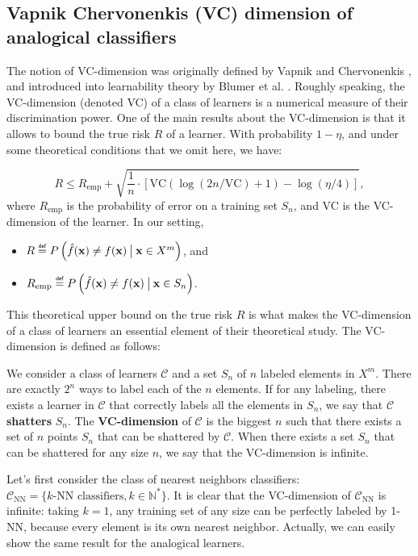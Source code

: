 \subsection{Vapnik Chervonenkis (VC) dimension of analogical classifiers}
\label{SEC:VCdim}
The notion of VC-dimension was originally defined by Vapnik and Chervonenkis
\cite{Vap98}, and introduced into learnability theory by Blumer et al.
\cite{BluEhrHauWarACM89}. Roughly speaking, the VC-dimension (denoted VC) of a class of
learners is a numerical measure of their discrimination power. One of the main
results about the VC-dimension is that it allows to bound the true risk $R$ of
a learner. With probability $1 - \eta$, and under some theoretical conditions
that we omit here, we have:

$$R \leq R_{\text{emp}} + \sqrt{\frac{1}{n} \cdot \left[\text{VC}(\log(2n /
\text{VC}) + 1) - \log(\eta/4)\right]},$$
where $R_\text{emp}$ is the probability of error on a training set $S_n$, and
VC is the VC-dimension of the learner. In our setting,
\begin{itemize}
  \item $R \eqdef P\left(\hat{f}(\mathbf{x}) \neq f(\mathbf{x}) \given[\big]
    \mathbf{x} \in X^m\right)$, and
  \item $R_\text{emp} \eqdef P\left(\hat{f}(\mathbf{x}) \neq f(\mathbf{x})
    \given[\big] \mathbf{x} \in S_n\right)$.
\end{itemize}

This theoretical upper bound on the true risk $R$ is what makes the
VC-dimension of a class of learners an essential element of their theoretical
study. The VC-dimension is defined as follows:

\begin{definition}[VC-dimension]
  \label{DEF:VCdim}
  We consider a class of learners $\mathcal{C}$ and a set $S_n$ of $n$ labeled
  elements in $X^m$. There are exactly $2^n$ ways to label each of the $n$
  elements. If for any labeling, there exists a learner in $\mathcal{C}$ that
  correctly labels all the elements in $S_n$, we say that $\mathcal{C}$
  \textbf{shatters} $S_n$.
  The \textbf{VC-dimension} of $\mathcal{C}$ is the biggest $n$ such that there exists a
  set of $n$ points $S_n$ that can be shattered by $\mathcal{C}$.  When there
  exists a set $S_n$ that can be shattered for any size $n$, we say that the
  VC-dimension is infinite.
\end{definition}


Let's first consider the class of nearest neighbors classifiers:
$\mathcal{C}_{\text{NN}}=\{ k\text{-NN classifiers}, k \in \mathbb{N}^*\}$. It
is clear that the VC-dimension of $\mathcal{C}_{\text{NN}}$ is infinite: taking
$k = 1$, any training set of any size can be perfectly labeled by 1-NN,
because every element is its own nearest neighbor. Actually, we can easily show
the same result for the analogical learners.

